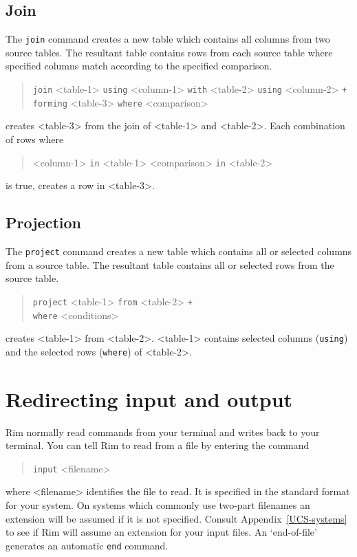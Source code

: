 \documentclass[11pt,a4paper]{report}
\begin{document}
\subsection{Join}
%
The \verb!join! command creates a new table which contains all
columns from two source tables.  The resultant
table contains rows from each source table
where specified columns match according to the specified comparison.
\begin{verse}
  \verb!join! <table-1> \verb!using! <column-1>
    \verb!with! <table-2> \verb!using! <column-2> \verb!+!\\
  \qquad  \verb!forming! <table-3>
    \verb!where! <comparison> 
  \end{verse}
creates <table-3> from the join of <table-1> and <table-2>.
Each combination of rows where
\begin{verse}
<column-1> \verb!in! <table-1> \qquad <comparison>  \verb!in! <table-2>
\end{verse}
is true, creates a row in <table-3>.
 
\subsection{Projection}
%
The \verb!project! command creates a new table which contains all
or selected columns from a source table.  The resultant
table contains all or selected rows from the source table.
\begin{verse}
  \verb!project! <table-1> \verb!from! <table-2>
   \verb!+!\\
 \qquad   \verb!where! <conditions> 
\end{verse}
creates <table-1> from <table-2>.
<table-1> contains selected columns (\verb!using!) and the
selected rows (\verb!where!) of <table-2>.
%
 
 
\section{Redirecting input and output}
%
Rim normally read commands from your terminal and writes back
to your terminal.  You can tell Rim to read from a file by
entering the command
\begin{verse}
 \verb!input! <filename>
\end{verse}
where <filename> identifies the file to read.  It is specified
in the standard format for your system.
On systems which commonly use two-part filenames an extension
will be assumed if it is not specified.
Consult Appendix~\ref{UCS-systems} to
see if Rim will assume an extension for your input files.
An `end-of-file' generates an automatic \verb!end! command.
 
\end{document}

